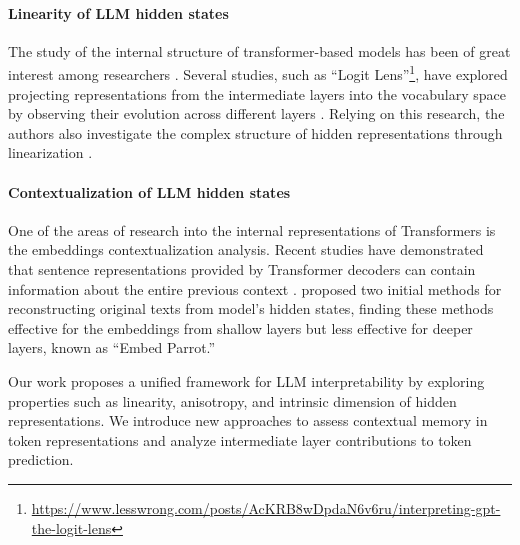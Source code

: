 \paragraph{Linearity of LLM hidden states}

The study of the internal structure of transformer-based models has been of great interest among researchers \cite{nostalgebraist2020,xu-etal-2021-probing,belrose2023eliciting,din2023jump,razzhigaev-etal-2024-shape}. Several studies, such as ``Logit Lens''\footnote{\url{https://www.lesswrong.com/posts/AcKRB8wDpdaN6v6ru/interpreting-gpt-the-logit-lens}}, have explored projecting representations from the intermediate layers into the vocabulary space by observing their evolution across different layers \cite{nostalgebraist2020,belrose2023eliciting}. Relying on this research, the authors also investigate the complex structure of hidden representations through linearization \cite{anthropic2021,razzhigaev2024transformersecretlylinear}.

\paragraph{Contextualization of LLM hidden states}

One of the areas of research into the internal representations of Transformers is the embeddings contextualization analysis. Recent studies have demonstrated that sentence representations provided by Transformer decoders can contain information about the entire previous context \cite{li-etal-2023-sentence,wan2024informationleakageembeddinglarge}. \citet{wan2024informationleakageembeddinglarge} proposed two initial methods for reconstructing original texts from model’s hidden states, finding these methods effective for the embeddings from shallow layers but less effective for deeper layers, known as ``Embed Parrot.''


Our work proposes a unified framework for LLM interpretability by exploring properties such as linearity, anisotropy, and intrinsic dimension of hidden representations. We introduce new approaches to assess contextual memory in token representations and analyze intermediate layer contributions to token prediction.